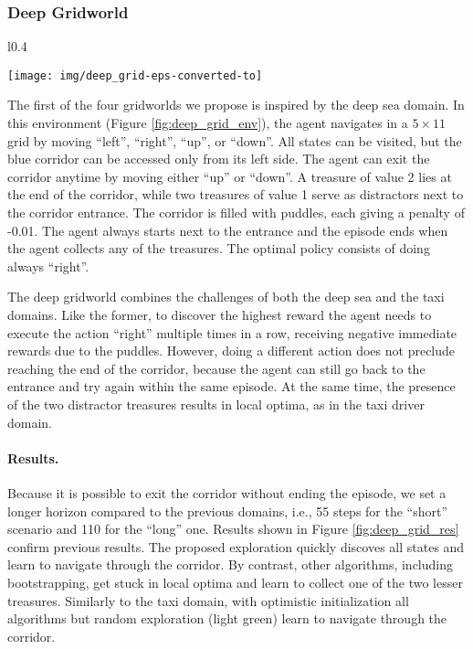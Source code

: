 \documentclass{article}
\begin{document}
\subsubsection{Deep Gridworld}
\label{sssec:deep_grid}
\begin{wrapfigure}{l}{0.4\textwidth}
	\begin{center}
		\vspace*{-0.7cm}
		\texttt{[image: img/deep\_grid-eps-converted-to]}
	\end{center}
	\vspace*{-0.5cm}
	\caption{The deep gridworld.}
	\label{fig:deep_grid_env}
	\vspace*{-0.4cm}
\end{wrapfigure}
The first of the four gridworlds we propose is inspired by the deep sea domain. 
In this environment (Figure \ref{fig:deep_grid_env}), the agent navigates in a $5\times11$ grid by moving ``left'', ``right'', ``up'', or ``down''. All states can be visited, but the blue corridor can be accessed only from its left side. The agent can exit the corridor anytime by moving either ``up'' or ``down''. A treasure of value 2 lies at the end of the corridor, while two treasures of value 1 serve as distractors next to the corridor entrance. The corridor is filled with puddles, each giving a penalty of -0.01. The agent always starts next to the entrance and the episode ends when the agent collects any of the treasures. The optimal policy consists of doing always ``right''.

The deep gridworld combines the challenges of both the deep sea and the taxi domains. Like the former, to discover the highest reward the agent needs to execute the action ``right'' multiple times in a row, receiving negative immediate rewards due to the puddles. However, doing a different action does not preclude reaching the end of the corridor, because the agent can still go back to the entrance and try again within the same episode. At the same time, the presence of the two distractor treasures results in local optima, as in the taxi driver domain.


\paragraph{Results.}
Because it is possible to exit the corridor without ending the episode, we set a longer horizon compared to the previous domains, i.e., 55 steps for the ``short'' scenario and 110 for the ``long'' one. Results shown in Figure \ref{fig:deep_grid_res} confirm previous results. The proposed exploration quickly discoves all states and learn to navigate through the corridor. By contrast, other algorithms, including bootstrapping, get stuck in local optima and learn to collect one of the two lesser treasures. Similarly to the taxi domain, with optimistic initialization all algorithms but random exploration (light green) learn to navigate through the corridor. 
\end{document}

